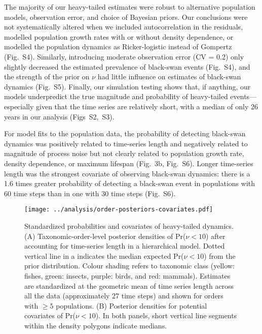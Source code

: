 \documentclass[9pt,twocolumn,twoside]{pnas-new}
\newcommand{\figsimnu}{{2}}
\newcommand{\figsimprob}{{3}}
\newcommand{\figalt}{{4}}
\newcommand{\figaltpriors}{{5}}
\newcommand{\figcorrelates}{{6}}
\begin{document}
The majority of our heavy-tailed estimates were robust to alternative
population models, observation error, and choice of Bayesian priors. Our
conclusions were not systematically altered when we included autocorrelation
in the residuals, modelled population growth rates with or without
density dependence, or modelled the population dynamics as Ricker-logistic
instead of Gompertz (Fig.~S\figalt). Similarly, introducing moderate
observation error (CV = 0.2) only slightly decreased the estimated prevalence
of black-swan events (Fig.~S\figalt), and the strength of the prior on
\(\nu\) had little influence on estimates of black-swan dynamics
(Fig.~S\figaltpriors). Finally, our simulation testing shows that, if
anything, our models underpredict the true magnitude and probability of
heavy-tailed events---especially given that the time series are relatively short,
with a median of only 26
years in our analysis (Figs~S\figsimnu,~S\figsimprob).


For model fits to the population data, the probability of detecting black-swan
dynamics was positively related to time-series length and negatively related to
magnitude of process noise but not clearly related to population growth rate,
density dependence, or maximum lifespan (Fig.~3b, Fig.~S\figcorrelates).
Longer time-series length was the strongest covariate of observing black-swan
dynamics: there is a 1.6 times greater probability of detecting a black-swan
event in populations with 60 time steps than in one with 30 time steps
(Fig.~S\figcorrelates).

\begin{figure}[htb]
\centering
\texttt{[image: ../analysis/order-posteriors-covariates.pdf]}
\caption{Standardized probabilities and covariates of heavy-tailed
dynamics. (A) Taxonomic-order-level posterior densities of Pr(\(\nu
< 10\)) after accounting for time-series length in a hierarchical model. Dotted
vertical line in a indicates the median expected Pr(\(\nu < 10\)) from the
prior distribution. Colour shading refers to taxonomic class (yellow: fishes,
green: insects, purple: birds, and red: mammals). Estimates are standardized at
the geometric mean of time series length across all the data (approximately 27
time steps) and shown for orders with \(\ge 5\) populations. (B)
Posterior densities for potential covariates of Pr(\(\nu < 10\)). In both
panels, short vertical line segments within the density polygons indicate
medians.
}
\label{fig:3}
\end{figure}
\end{document}
